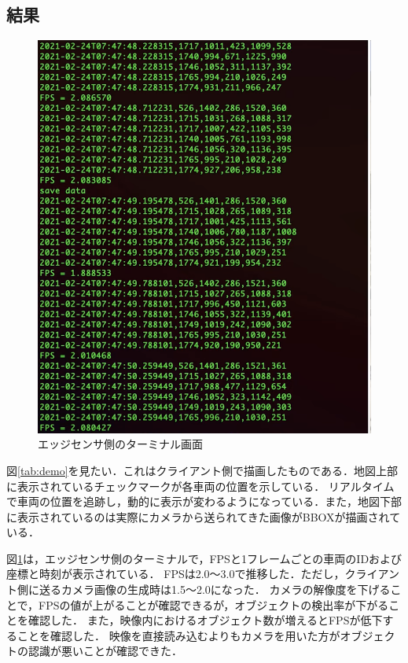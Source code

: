 \documentclass[technicalreport]{ieicej}
\begin{document}
\subsection{結果}
\begin{figure}[t]
  \includegraphics*[bb=0 100 200 400, width=1\linewidth]{./images/term.png}
  \caption{エッジセンサ側のターミナル画面} 
  \label{tab:term}
\end{figure}
図\ref{tab:demo}を見たい．これはクライアント側で描画したものである．地図上部に表示されているチェックマークが各車両の位置を示している．
リアルタイムで車両の位置を追跡し，動的に表示が変わるようになっている．また，地図下部に表示されているのは実際にカメラから送られてきた画像がBBOXが描画されている．

図\ref{tab:term}は，エッジセンサ側のターミナルで，FPSと1フレームごとの車両のIDおよび座標と時刻が表示されている．
FPSは2.0〜3.0で推移した．ただし，クライアント側に送るカメラ画像の生成時は1.5〜2.0になった．
カメラの解像度を下げることで，FPSの値が上がることが確認できるが，オブジェクトの検出率が下がることを確認した．
また，映像内におけるオブジェクト数が増えるとFPSが低下することを確認した．
映像を直接読み込むよりもカメラを用いた方がオブジェクトの認識が悪いことが確認できた．
\end{document}
